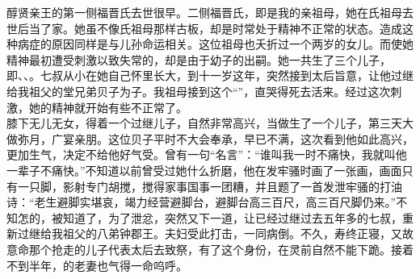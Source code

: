 醇贤亲王的第一侧福晋氏去世很早。二侧福晋氏，即是我的亲祖母，她在氏祖母去世后当了家。她虽不像氏祖母那样古板，却是时常处于精神不正常的状态。造成这种病症的原因同样是与儿孙命运相关。这位祖母也夭折过一个两岁的女儿。而使她精神最初遭受刺激以致失常的，却是由于幼子的出嗣。她一共生了三个儿子，即、、。七叔从小在她自己怀里长大，到十一岁这年，突然接到太后旨意，让他过继给我祖父的堂兄弟贝子为子。我祖母接到这个“”，直哭得死去活来。经过这次刺激，她的精神就开始有些不正常了。\\

膝下无儿无女，得着一个过继儿子，自然非常高兴，当做生了一个儿子，第三天大做弥月，广宴亲朋。这位贝子平时不大会奉承，早已不满，这次看到他如此高兴，更加生气，决定不给他好气受。曾有一句“名言”：“谁叫我一时不痛快，我就叫他一辈子不痛快。”不知道以前曾受过她什么折磨，他在发牢骚时画了一张画，画面只有一只脚，影射专门胡搅，搅得家事国事一团糟，并且题了一首发泄牢骚的打油诗：“老生避脚实堪哀，竭力经营避脚台，避脚台高三百尺，高三百尺脚仍来。”不知怎的，被知道了，为了泄忿，突然又下一道，让已经过继过去五年多的七叔，重新过继给我祖父的八弟钟郡王。夫妇受此打击，一同病倒。不久，寿终正寝，又故意命那个抢走的儿子代表太后去致祭，有了这个身份，在灵前自然不能下跪。接着不到半年，的老妻也气得一命呜呼。\\

